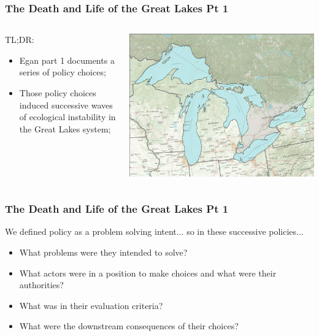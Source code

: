 \documentclass[aspectratio=169]{beamer}
\theoremstyle{principle}
\begin{document}
\begin{frame}
\frametitle{The Death and Life of the Great Lakes Pt 1}

\begin{columns}

\begin{column}{0.5\textwidth}
TL;DR:
\bigskip
\begin{itemize}
\item Egan part 1 documents a series of policy choices;
\bigskip
\item Those policy choices induced successive waves of ecological instability in the Great Lakes system;
\end{itemize}

\end{column}

\begin{column}{0.5\textwidth}  %
    \begin{center}
     \includegraphics[scale=0.27]{great_lakes.png}
     \end{center}
\end{column}

\end{columns}

\end{frame}

\begin{frame}
\frametitle{The Death and Life of the Great Lakes Pt 1}
We defined policy as a problem solving intent... so in these successive policies...
\begin{itemize}
\item What problems were they intended to solve?
\bigskip
\bigskip
\item What actors were in a position to make choices and what were their authorities?
\bigskip
\bigskip
\item What was in their evaluation criteria?
\bigskip
\bigskip
\item What were the downstream consequences of their choices?
\end{itemize}
\end{frame}
\end{document}

